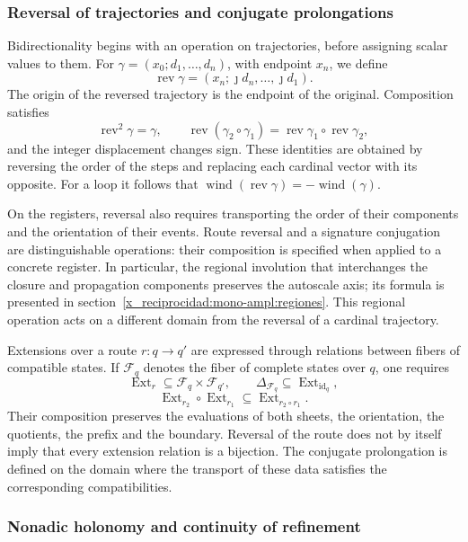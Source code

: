 \subsubsection{Reversal of trajectories and conjugate prolongations}
\label{x_reciprocidad:tpk-int:bidireccionalidad}

Bidirectionality begins with an operation on trajectories, before
assigning scalar values to them. For
\(\gamma=(x_0;d_1,\ldots,d_n)\), with endpoint \(x_n\), we define
\[
 \operatorname{rev}\gamma
   =(x_n;\jmath d_n,\ldots,\jmath d_1).
\]
The origin of the reversed trajectory is the endpoint of the original.
Composition satisfies
\[
 \operatorname{rev}^2\gamma=\gamma,\qquad
 \operatorname{rev}(\gamma_2\circ\gamma_1)
   =\operatorname{rev}\gamma_1\circ\operatorname{rev}\gamma_2,
\]
and the integer displacement changes sign. These identities are obtained
by reversing the order of the steps and replacing each cardinal vector with
its opposite. For a loop it follows that
\(\operatorname{wind}(\operatorname{rev}\gamma)
=-\operatorname{wind}(\gamma)\).

On the registers, reversal also requires transporting the order
of their components and the orientation of their events. Route reversal
and a signature conjugation are distinguishable operations: their
composition is specified when applied to a concrete register. In
particular, the regional involution that interchanges the closure
and propagation components preserves the autoscale axis; its formula is
presented in section~\ref{x_reciprocidad:mono-ampl:regiones}. This regional operation
acts on a different domain from the reversal of a cardinal trajectory.

Extensions over a route \(r:q\to q'\) are expressed through
relations between fibers of compatible states. If \(\mathcal F_q\)
denotes the fiber of complete states over \(q\), one requires
\[
 \operatorname{Ext}_r\subseteq\mathcal F_q\times\mathcal F_{q'},
 \qquad \Delta_{\mathcal F_q}\subseteq
        \operatorname{Ext}_{\operatorname{id}_q},
\]
\[
 \operatorname{Ext}_{r_2}\circ\operatorname{Ext}_{r_1}
       \subseteq\operatorname{Ext}_{r_2\circ r_1}.
\]
Their composition preserves the evaluations of both sheets, the orientation,
the quotients, the prefix and the boundary. Reversal of the route does not
by itself imply that every extension relation is a bijection.
The conjugate prolongation is defined on the domain where the transport of
these data satisfies the corresponding compatibilities.

\subsubsection{Nonadic holonomy and continuity of refinement}
\label{x_reciprocidad:tpk-int:holonomia}

